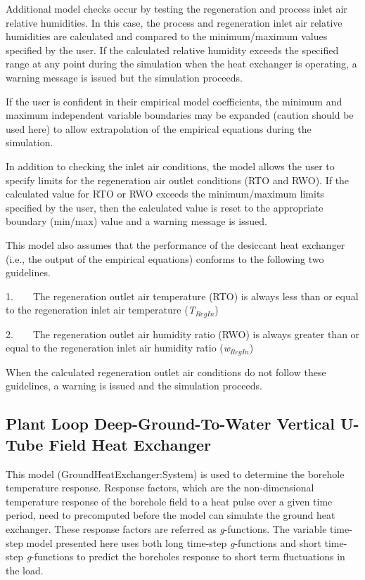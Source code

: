 Additional model checks occur by testing the regeneration and process inlet air relative humidities. In this case, the process and regeneration inlet air relative humidities are calculated and compared to the minimum/maximum values specified by the user. If the calculated relative humidity exceeds the specified range at any point during the simulation when the heat exchanger is operating, a warning message is issued but the simulation proceeds.

If the user is confident in their empirical model coefficients, the minimum and maximum independent variable boundaries may be expanded (caution should be used here) to allow extrapolation of the empirical equations during the simulation.

In addition to checking the inlet air conditions, the model allows the user to specify limits for the regeneration air outlet conditions (RTO and RWO). If the calculated value for RTO or RWO exceeds the minimum/maximum limits specified by the user, then the calculated value is reset to the appropriate boundary (min/max) value and a warning message is issued.

This model also assumes that the performance of the desiccant heat exchanger (i.e., the output of the empirical equations) conforms to the following two guidelines.

1.~~~~The regeneration outlet air temperature (RTO) is always less than or equal to the regeneration inlet air temperature (\emph{T\(_{RegIn}\)})

2.~~~~The regeneration outlet air humidity ratio (RWO) is always greater than or equal to the regeneration inlet air humidity ratio (\emph{w\(_{RegIn}\)})

When the calculated regeneration outlet air conditions do not follow these guidelines, a warning is issued and the simulation proceeds.

\subsection{Plant Loop Deep-Ground-To-Water Vertical U-Tube Field Heat Exchanger}\label{plant-loop-deep-ground-to-water-vertical-u-tube-field-heat-exchanger}

This model (GroundHeatExchanger:System) is used to determine the borehole temperature response. Response factors, which are the non-dimensional temperature response of the borehole field to a heat pulse over a given time period, need to precomputed before the model can simulate the ground heat exchanger. These response factors are referred as \emph{g}-functions. The variable time-step model presented here uses both long time-step \emph{g}-functions and short time-step \emph{g}-functions to predict the boreholes response to short term fluctuations in the load.

